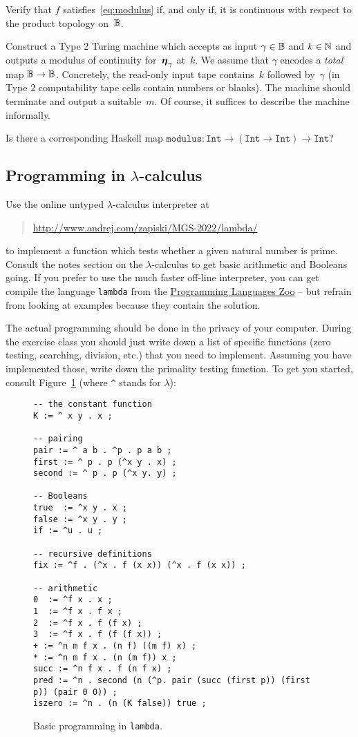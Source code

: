 \documentclass{article}
\begin{document}
Verify that $f$ satisfies~\eqref{eq:modulus} if, and only if, it is continuous with respect to the product topology on~$\mathbb{B}$.

Construct a Type 2 Turing machine which accepts as input $\gamma \in \mathbb{B}$ and $k \in \mathbb{N}$ and outputs a modulus of continuity for~$\text{\boldmath{$\eta$}}_\gamma$ at~$k$. We assume that $\gamma$ encodes a \emph{total} map $\mathbb{B} \to \mathbb{B}$. Concretely, the read-only input tape contains~$k$ followed by~$\gamma$ (in Type 2 computability tape cells contain numbers or blanks). The machine should terminate and output a suitable~$m$. Of course, it suffices to describe the machine informally.

\medskip

Is there a corresponding Haskell map $\mathtt{modulus} : \mathtt{Int} \to (\mathtt{Int} \to \mathtt{Int}) \to \mathtt{Int}$?


\subsection{Programming in $\lambda$-calculus}
\label{sec:encod-gener-recurs}

Use the online untyped $\lambda$-calculus interpreter at
%
\begin{quote}
  \url{http://www.andrej.com/zapiski/MGS-2022/lambda/}
\end{quote}
%
to implement a function which tests whether a given natural number is prime. Consult the notes section on the $\lambda$-calculus to get basic arithmetic and Booleans going.
%
If you prefer to use the much faster off-line interpreter, you can get compile the language \texttt{lambda} from the \href{http://plzoo.andrej.com/language/lambda.html}{Programming Languages Zoo} -- but refrain from looking at examples because they contain the solution.

The actual programming should be done in the privacy of your computer. During the exercise class you should just write down a list of specific functions (zero testing, searching, division, etc.) that you need to implement. Assuming you have implemented those, write down the primality testing function. To get you started, consult Figure~\ref{fig:lambda} (where \lstinline|^| stands for $\lambda$):

\begin{figure}[htp]
  \centering
\begin{lstlisting}
-- the constant function
K := ^ x y . x ;

-- pairing
pair := ^ a b . ^p . p a b ;
first := ^ p . p (^x y . x) ;
second := ^ p . p (^x y. y) ;

-- Booleans
true  := ^x y . x ;
false := ^x y . y ;
if := ^u . u ;

-- recursive definitions
fix := ^f . (^x . f (x x)) (^x . f (x x)) ;

-- arithmetic
0  := ^f x . x ;
1  := ^f x . f x ;
2  := ^f x . f (f x) ;
3  := ^f x . f (f (f x)) ;
+ := ^n m f x . (n f) ((m f) x) ;
* := ^n m f x . (n (m f)) x ;
succ := ^n f x . f (n f x) ;
pred := ^n . second (n (^p. pair (succ (first p)) (first p)) (pair 0 0)) ;
iszero := ^n . (n (K false)) true ;
\end{lstlisting}
  \caption{Basic programming in \texttt{lambda}.}
  \label{fig:lambda}
\end{figure}
\end{document}
